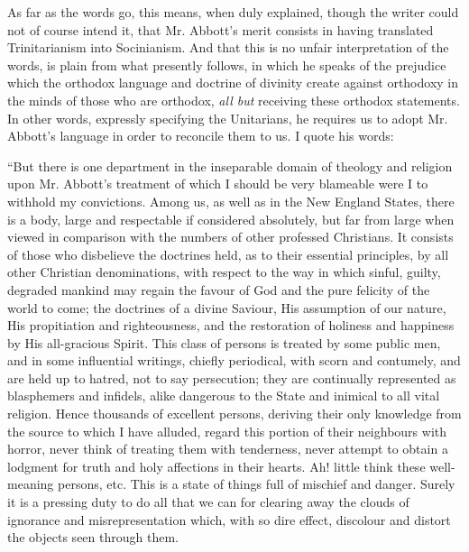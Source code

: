 As far as the words go, this means, when duly
explained, though the writer could not of course intend it, that Mr.
Abbott's merit consists in having translated Trinitarianism into
Socinianism. And that this is no unfair interpretation of the words,
is plain from what presently follows, in which he speaks of the
prejudice which the orthodox language and doctrine of divinity create
against orthodoxy in the minds of those who are orthodox, \emph{all but}
receiving these orthodox statements. In other words, expressly
specifying the Unitarians, he requires us to adopt Mr. Abbott's
language in order to reconcile them to us. I quote his words:

``But there is one department
in the inseparable domain of theology and religion upon Mr. Abbott's
treatment of which I should be very blameable were I to withhold my
convictions. Among us, as well as in the New England States, there is
a body, large and respectable if considered absolutely, but far from
large when viewed in comparison with the numbers of other professed
Christians. It consists of those who disbelieve the doctrines held, as
to their essential principles, by all other Christian denominations,
with respect to the way in which sinful, guilty, degraded mankind may
regain the favour of God and the pure felicity of the world to come;
the doctrines of a divine Saviour, His assumption of our nature, His
propitiation and righteousness, and the restoration of holiness and
happiness by His all-gracious Spirit. This class of persons is treated
by some public men, and in some influential writings, chiefly
periodical, with scorn and contumely, and are held up to hatred, not
to say persecution; they are continually represented as blasphemers
and infidels, alike dangerous to the State and inimical to all vital
religion. Hence thousands of excellent persons, deriving their only
knowledge from the source to which I have alluded, regard this portion
of their neighbours with horror, never think of treating them with
tenderness, never attempt to obtain a lodgment for truth and holy
affections in their hearts. Ah! little think these well-meaning
persons, etc. This is a state of things full of mischief and danger.
Surely it is a pressing duty to do all that we can for clearing away
the clouds of ignorance and misrepresentation which, with so dire
effect, discolour and distort the objects seen through them.

